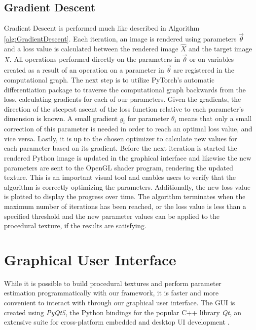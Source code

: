 \subsection{Gradient Descent}

Gradient Descent is performed much like described in Algorithm \ref{alg:GradientDescent}. Each iteration, an image is rendered using parameters $\vec{\theta}$ and a loss value is calculated between the rendered image $\hat{X}$ and the target image $X$. All operations performed directly on the parameters in $\vec{\theta}$ or on variables created as a result of an operation on a parameter in $\vec{\theta}$ are registered in the computational graph. The next step is to utilize PyTorch's automatic differentiation package to traverse the computational graph backwards from the loss, calculating gradients for each of our parameters. Given the gradients, the direction of the steepest ascent of the loss function relative to each parameter's dimension is known. A small gradient $g_i$ for parameter $\theta_i$ means that only a small correction of this parameter is needed in order to reach an optimal loss value, and vice versa. Lastly, it is up to the chosen optimizer to calculate new values for each parameter based on its gradient. Before the next iteration is started the rendered Python image is updated in the graphical interface and likewise the new parameters are sent to the OpenGL shader program, rendering the updated texture. This is an important visual tool and enables users to verify that the algorithm is correctly optimizing the parameters. Additionally, the new loss value is plotted to display the progress over time. The algorithm terminates when the maximum number of iterations has been reached, or the loss value is less than a specified threshold and the new parameter values can be applied to the procedural texture, if the results are satisfying. 

\section{Graphical User Interface}

While it is possible to build procedural textures and perform parameter estimation programmatically with our framework, it is faster and more convenient to interact with \dipter{} through our graphical user interface. The GUI is created using \textit{PyQt5}, the Python bindings for the popular C++ library \textit{Qt}, an extensive suite for cross-platform embedded and desktop UI development \cite{riverbankcomputing_2020_what,theqtcompany_qt}.

